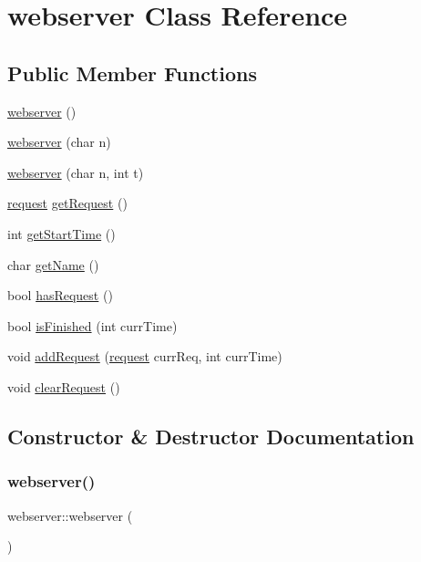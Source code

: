 \hypertarget{classwebserver}{}\section{webserver Class Reference}
\label{classwebserver}
\subsection*{Public Member Functions}
\begin{DoxyCompactItemize}
\item 
\hyperlink{classwebserver_ae6f13a3cb80fe961cdaf70c7e03f36dc}{webserver} ()
\item 
\hyperlink{classwebserver_a31eed476ee2971a92e877923ea7c97fc}{webserver} (char n)
\item 
\hyperlink{classwebserver_abf14dc8da82c8ba9277a25a18aaabaef}{webserver} (char n, int t)
\item 
\hyperlink{structrequest}{request} \hyperlink{classwebserver_a8e97c299c64c0f9f46052a88888c7fc9}{get\+Request} ()
\item 
int \hyperlink{classwebserver_abaf7c05ca6d47a7800cfbcde62fa1744}{get\+Start\+Time} ()
\item 
char \hyperlink{classwebserver_ab60b4b73f23fab34800070996212c497}{get\+Name} ()
\item 
bool \hyperlink{classwebserver_a766a603b21e0b4872fe28c3e747d104b}{has\+Request} ()
\item 
bool \hyperlink{classwebserver_ab0d202209647832942f60806dd3835ef}{is\+Finished} (int curr\+Time)
\item 
void \hyperlink{classwebserver_a013eb6e8956b29bcc13608bb54bd2cc5}{add\+Request} (\hyperlink{structrequest}{request} curr\+Req, int curr\+Time)
\item 
void \hyperlink{classwebserver_ab2c7ce0a757e7f5e6c9c33d1e7ff1cbc}{clear\+Request} ()
\end{DoxyCompactItemize}


\subsection{Constructor \& Destructor Documentation}
\mbox{\label{classwebserver_ae6f13a3cb80fe961cdaf70c7e03f36dc}} 
\subsubsection{\texorpdfstring{webserver()}{webserver()}\hspace{0.1cm}{\footnotesize\ttfamily [1/3]}}
{\footnotesize\ttfamily webserver\+::webserver (\begin{DoxyParamCaption}{ }\end{DoxyParamCaption})\hspace{0.3cm}{\ttfamily [inline]}}


